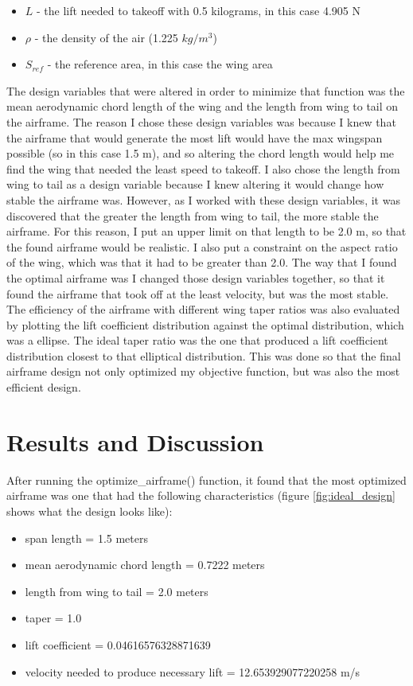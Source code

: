 \documentclass{journal}
\begin{document}
	\begin{itemize}
		\item \(L\) - the lift needed to takeoff with 0.5 kilograms, in this case 4.905 N
		\item \(\rho\) - the density of the air (1.225 \(kg/m^3\))
		\item \(S_{ref}\) - the reference area, in this case the wing area
	\end{itemize}
	
	The design variables that were altered in order to minimize that function was the mean aerodynamic chord length of the wing and the length from wing to tail on the airframe. The reason I chose these design variables was because I knew that the airframe that would generate the most lift would have the max wingspan possible (so in this case 1.5 m), and so altering the chord length would help me find the wing that needed the least speed to takeoff. I also chose the length from wing to tail as a design variable because I knew altering it would change how stable the airframe was. However, as I worked with these design variables, it was discovered that the greater the length from wing to tail, the more stable the airframe. For this reason, I put an upper limit on that length to be 2.0 m, so that the found airframe would be realistic. I also put a constraint on the aspect ratio of the wing, which was that it had to be greater than 2.0. The way that I found the optimal airframe was I changed those design variables together, so that it found the airframe that took off at the least velocity, but was the most stable. The efficiency of the airframe with different wing taper ratios was also evaluated by plotting the lift coefficient distribution against the optimal distribution, which was a ellipse. The ideal taper ratio was the one that produced a lift coefficient distribution closest to that elliptical distribution. This was done so that the final airframe design not only optimized my objective function, but was also the most efficient design.
		
	\section{Results and Discussion}
	
	After running the optimize\_airframe() function, it found that the most optimized airframe was one that had the following characteristics (figure \ref{fig:ideal_design} shows what the design looks like):
	
	\begin{itemize}
		\item span length = 1.5 meters
		\item mean aerodynamic chord length = 0.7222 meters
		\item length from wing to tail = 2.0 meters
		\item taper = 1.0
		\item lift coefficient = 0.04616576328871639
		\item velocity needed to produce necessary lift = 12.653929077220258 m/s
	\end{itemize}
\end{document}
